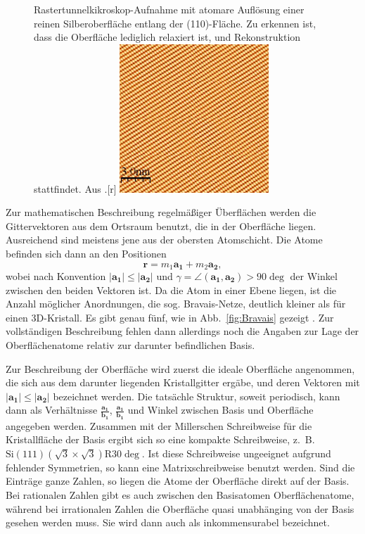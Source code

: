 \begin{figure}[!t]
  \begin{captionbeside}[]{Rastertunnelkikroskop-Aufnahme mit atomare Auflösung einer reinen 
Silberoberfläche entlang der (110)-Fläche. Zu erkennen ist, dass die Oberfläche 
lediglich relaxiert ist, und Rekonstruktion stattfindet. 
Aus \cite{kahn:stm_images}.}[r]
    \includegraphics[width=0.5\textwidth]{pics/Ag(110)_clean}
  \end{captionbeside}
  \label{fig:Ag(110)}
\end{figure}

Zur mathematischen Beschreibung regelmäßiger Überflächen werden die Gittervektoren 
aus dem Ortsraum benutzt, die in der Oberfläche liegen. Ausreichend sind meistens 
jene aus der obersten Atomschicht. Die Atome befinden sich dann an den Positionen 
\begin{equation}
    \mathbf{r} = m_1 \mathbf{a_1} + m_2 \mathbf{a_2},
\end{equation}
wobei nach Konvention $|\mathbf{a_1}| \le |\mathbf{a_2}|$ und 
$\gamma = \angle (\mathbf{a_1}, \mathbf{a_2}) > 90 \deg$ der Winkel zwischen den 
beiden Vektoren ist. Da die Atom in einer Ebene liegen, ist die Anzahl möglicher 
Anordnungen, die sog. Bravais-Netze, deutlich kleiner als für einen 3D-Kristall. 
Es gibt genau fünf, wie in Abb.~\ref{fig:Bravais} gezeigt 
\cite{henzler1991oberflachenphysik}.
Zur vollständigen Beschreibung fehlen dann allerdings noch die Angaben zur Lage 
der Oberflächenatome relativ zur darunter befindlichen Basis. 

Zur Beschreibung der Oberfläche wird zuerst die ideale Oberfläche angenommen, 
die sich aus dem darunter liegenden Kristallgitter ergäbe, und deren Vektoren mit
$|\mathbf{a_1}| \le |\mathbf{a_2}|$ bezeichnet werden. Die tatsächle Struktur, 
soweit periodisch, kann dann als Verhältnisse $\frac{\mathbf{a_1}}{\mathbf{b_1}}$, 
$\frac{\mathbf{a_1}}{\mathbf{b_1}}$ und Winkel zwischen Basis und Oberfläche angegeben 
werden. Zusammen mit der Millerschen Schreibweise für die Kristallfläche der Basis 
ergibt sich so eine kompakte Schreibweise, z.~B. 
$\mathrm{Si}(111)(\sqrt{3} \times \sqrt{3}) \mathrm{R} 30 \deg$. 
Ist diese Schreibweise ungeeignet aufgrund fehlender Symmetrien, so kann eine 
Matrixschreibweise benutzt werden. Sind die Einträge ganze Zahlen, so liegen die 
Atome der Oberfläche direkt auf der Basis. Bei rationalen Zahlen gibt es auch 
zwischen den Basisatomen Oberflächenatome, während bei irrationalen Zahlen die 
Oberfläche quasi unabhänging von der Basis gesehen werden muss. Sie wird dann auch 
als inkommensurabel bezeichnet. \cite{henzler1991oberflachenphysik}

